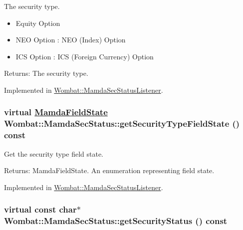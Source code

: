 The security type. 

\begin{itemize}
\item Equity Option \item NEO Option : NEO (Index) Option \item ICS Option : ICS (Foreign Currency) Option \end{itemize}


\begin{Desc}
\item[Returns:]The security type. \end{Desc}


Implemented in \hyperlink{classWombat_1_1MamdaSecStatusListener_2f643f3f70d52943af0b2ac011c1fa3b}{Wombat::Mamda\-Sec\-Status\-Listener}.\hypertarget{classWombat_1_1MamdaSecStatus_ab32e4e57845c7982605e64abadbcaf0}{
\subsubsection[getSecurityTypeFieldState]{\setlength{\rightskip}{0pt plus 5cm}virtual \hyperlink{namespaceWombat_93aac974f2ab713554fd12a1fa3b7d2a}{Mamda\-Field\-State} Wombat::Mamda\-Sec\-Status::get\-Security\-Type\-Field\-State () const}}
\label{classWombat_1_1MamdaSecStatus_ab32e4e57845c7982605e64abadbcaf0}


Get the security type field state. 

\begin{Desc}
\item[Returns:]Mamda\-Field\-State. An enumeration representing field state. \end{Desc}


Implemented in \hyperlink{classWombat_1_1MamdaSecStatusListener_61d631913cca79d7919a225c9d42e5d1}{Wombat::Mamda\-Sec\-Status\-Listener}.\hypertarget{classWombat_1_1MamdaSecStatus_ea108ad9235e4c39c8f5474cbb6c003f}{
\subsubsection[getSecurityStatus]{\setlength{\rightskip}{0pt plus 5cm}virtual const char$\ast$ Wombat::Mamda\-Sec\-Status::get\-Security\-Status () const}}
\label{classWombat_1_1MamdaSecStatus_ea108ad9235e4c39c8f5474cbb6c003f}


